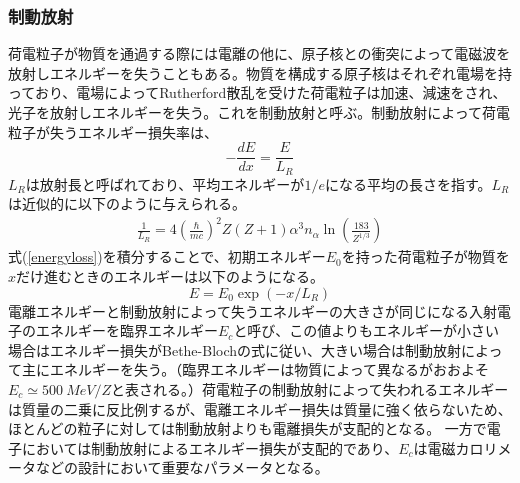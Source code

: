 \subsubsection{制動放射}
荷電粒子が物質を通過する際には電離の他に、原子核との衝突によって電磁波を放射しエネルギーを失うこともある。物質を構成する原子核はそれぞれ電場を持っており、電場によってRutherford散乱を受けた荷電粒子は加速、減速をされ、光子を放射しエネルギーを失う。これを制動放射と呼ぶ。制動放射によって荷電粒子が失うエネルギー損失率は、
\begin{equation}
	\label{energyloss}
	- { \frac{dE}{dx} } = \frac{E}{L_R}
\end{equation}
$L_R$は放射長と呼ばれており、平均エネルギーが$1/e$になる平均の長さを指す。$L_R$は近似的に以下のように与えられる。
\begin{align}
\frac{1}{L_R} = 4 {\left( \frac{\hbar}{mc} \right)}^2 Z (Z+1) {\alpha}^3 n_{\alpha} \ln\left(\frac{183}{Z^{1/3}}\right)
\end{align}
式(\ref{energyloss})を積分することで、初期エネルギー$E_0$を持った荷電粒子が物質を$x$だけ進むときのエネルギーは以下のようになる。
\begin{equation}
E = E_0 \exp(-x/L_R)
\end{equation}
電離エネルギーと制動放射によって失うエネルギーの大きさが同じになる入射電子のエネルギーを臨界エネルギー$E_c$と呼び、この値よりもエネルギーが小さい場合はエネルギー損失がBethe-Blochの式に従い、大きい場合は制動放射によって主にエネルギーを失う。（臨界エネルギーは物質によって異なるがおおよそ$E_c \simeq \SI{500}{MeV} / Z$と表される。）荷電粒子の制動放射によって失われるエネルギーは質量の二乗に反比例するが、電離エネルギー損失は質量に強く依らないため、ほとんどの粒子に対しては制動放射よりも電離損失が支配的となる。 一方で電子においては制動放射によるエネルギー損失が支配的であり、$E_c$は電磁カロリメータなどの設計において重要なパラメータとなる。

